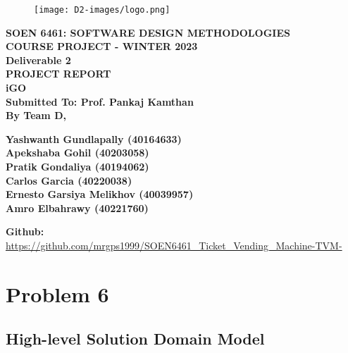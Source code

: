 \documentclass[a4paper,12pt]{report}
\begin{document}
\begin{titlepage}
   \begin{center}
       \vspace*{-8ex}
        \begin{figure}[h!]
  \centering
  \texttt{[image: D2-images/logo.png]} \\[1in]
\end{figure}
       \textbf{\large SOEN 6461: SOFTWARE DESIGN METHODOLOGIES}\\[0.3in]
        \textbf{\large COURSE PROJECT - WINTER 2023} \\ [0.3in]
        \textbf{\large Deliverable 2} \\[1.5in]
        \textbf{\large PROJECT REPORT}\\[0.2in]
        \textbf{\large iGO}\\[0.6in]
       \vspace{1.0cm}
       \textbf{\large Submitted To: Prof. Pankaj Kamthan}\\ [0.7in]
        \textbf{By Team D,}
        \begin{flushright}
            \textbf{Yashwanth Gundlapally (40164633)}\\
            \textbf{Apekshaba Gohil (40203058)}\\
            \textbf{Pratik Gondaliya (40194062)}\\
            \textbf{Carlos Garcia (40220038)}\\
            \textbf{Ernesto Garsiya Melikhov (40039957)}\\
            \textbf{Amro Elbahrawy (40221760)} \\ [0.5in]
        \end{flushright}
        \textbf{Github:}\\
        \url{https://github.com/mrgps1999/SOEN6461_Ticket_Vending_Machine-TVM-}
       \vfill
   \end{center}
\end{titlepage}
\tableofcontents
\setcounter{chapter}{5}
\chapter{Problem 6}
\section{High-level Solution Domain Model}
\end{document}
